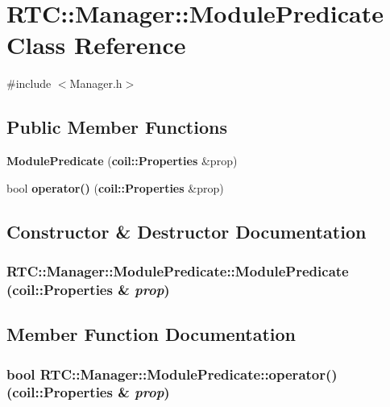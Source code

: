\section{RTC::Manager::ModulePredicate Class Reference}
\label{classRTC_1_1Manager_1_1ModulePredicate}


{\ttfamily \#include $<$Manager.h$>$}

\subsection*{Public Member Functions}
\begin{DoxyCompactItemize}
\item 
{\bf ModulePredicate} ({\bf coil::Properties} \&prop)
\item 
bool {\bf operator()} ({\bf coil::Properties} \&prop)
\end{DoxyCompactItemize}


\subsection{Constructor \& Destructor Documentation}
\subsubsection[{ModulePredicate}]{\setlength{\rightskip}{0pt plus 5cm}RTC::Manager::ModulePredicate::ModulePredicate ({\bf coil::Properties} \& {\em prop})\hspace{0.3cm}{\ttfamily  [inline]}}\label{classRTC_1_1Manager_1_1ModulePredicate_a87f556d3d2b1d8cc0568821c258cad1d}


\subsection{Member Function Documentation}
\subsubsection[{operator()}]{\setlength{\rightskip}{0pt plus 5cm}bool RTC::Manager::ModulePredicate::operator() ({\bf coil::Properties} \& {\em prop})\hspace{0.3cm}{\ttfamily  [inline]}}\label{classRTC_1_1Manager_1_1ModulePredicate_a0ddaada4fc3ed47219fc8bacf7da0aa8}
